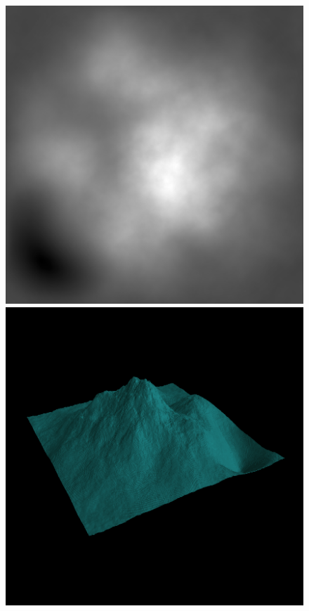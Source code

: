 	\begin{figure}[H]
		\centering
		\includegraphics[width=\imagewidth]{images/results/terrains/512-1/blending/quadratic}
		\includegraphics[width=\imagewidth]{images/results/terrains/512-1/blending/quadratic_3d}

\end{figure}
